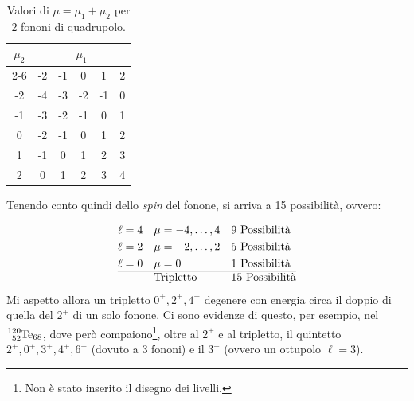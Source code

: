 \begin{table}[!h]
    \centering
    \begin{tabular}{|c|ccccc|}
        \hline
        \multirow{3}{*}{$\mu_2$} & \multicolumn{5}{c|}{$\mu_1$} \\
        \cline{2-6}
         & -2 & -1 & 0 & 1 & 2 \\
        \hline
        -2 & -4 & -3 & -2 & -1 & 0 \\
        -1 & -3 & -2 & -1 & 0 & 1 \\
        0 & -2 & -1 & 0 & 1 & 2 \\
        1 & -1 & 0 & 1 & 2 & 3 \\
        2 & 0 & 1 & 2 & 3 & 4 \\
        \hline
    \end{tabular}
    \caption{Valori di $\mu=\mu_1+\mu_2$ per 2 fononi di quadrupolo.}
    \label{mumu}
\end{table}
\noindent Tenendo conto quindi dello \textit{spin} del fonone, si arriva a 15 possibilità, ovvero:

\begin{displaymath}
\begin{aligned}
&\ell = 4 & &\mu=-4,\dots,4 & &9 \text{ Possibilità} \\
&\ell = 2 & &\mu=-2,\dots,2 & &5 \text{ Possibilità} \\
&\ell = 0 & &\mu=0 & &1 \text{ Possibilità}\\ 
\hline
& & &\text{Tripletto} & &15 \text{ Possibilità} 
\end{aligned}
\end{displaymath}
\noindent Mi aspetto allora un tripletto $0^+,2^+,4^+$ degenere con energia circa il doppio di quella del $2^+$ di un solo fonone. Ci sono evidenze di questo, per esempio, nel $\ce{^{120}_{52}Te_{68}}$, dove però compaiono\footnote{Non è stato inserito il disegno dei livelli.}, oltre al $2^+$ e al tripletto, il quintetto $2^+,0^+,3^+,4^+,6^+$ (dovuto a 3 fononi) e il $3^-$ (ovvero un ottupolo $\ell=3$).

